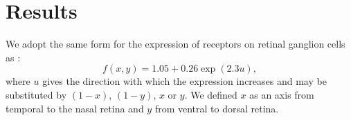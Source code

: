\documentclass[9pt,lineno,draft]{elife}
\begin{document}

\section{Results}


We adopt the same form for the expression of receptors on retinal ganglion cells as
\citet{simpson_simple_2011}:
\begin{equation} \label{e:f}
  f(x,y) = 1.05 + 0.26 \exp(2.3 u),
\end{equation}
where $u$ gives the direction with which the expression increases and may be substituted by $(1-x)$, $(1-y)$, $x$ or $y$. We defined $x$ as an axis from temporal to the nasal retina and $y$ from ventral to dorsal retina.
\end{document}
